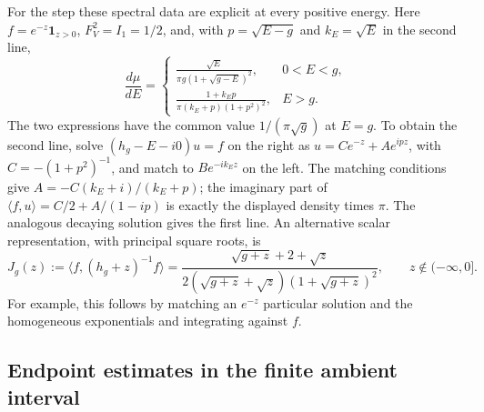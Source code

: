 \documentclass[aps,prl,reprint,superscriptaddress,longbibliography]{revtex4-2}
\begin{document}
For the step these spectral data are explicit at every positive energy.
Here $f=e^{-z}\mathbf1_{z>0}$, $F_V^2=I_1=1/2$, and, with
$p=\sqrt{E-g}$ and $k_E=\sqrt E$ in the second line,
\begin{equation}
 \frac{d\mu}{dE}=
 \begin{cases}
 \displaystyle\frac{\sqrt E}{\pi g(1+\sqrt{g-E})^2},&0<E<g,\\[6pt]
 \displaystyle\frac{1+k_Ep}{\pi(k_E+p)(1+p^2)^2},&E>g.
 \end{cases}
 \label{sc:step-density}
\end{equation}
The two expressions have the common value $1/(\pi\sqrt g)$ at $E=g$.
To obtain the second line, solve $(h_g-E-i0)u=f$ on the right as
$u=Ce^{-z}+Ae^{ipz}$, with
$C=-(1+p^2)^{-1}$, and match to $Be^{-ik_Ez}$ on the left. The matching
conditions give $A=-C(k_E+i)/(k_E+p)$; the imaginary part of
$\langle f,u\rangle=C/2+A/(1-ip)$ is exactly the displayed density
times $\pi$. The analogous decaying solution gives the first line.
An alternative scalar representation, with principal square roots, is
\begin{equation}
 J_g(z):=\langle f,(h_g+z)^{-1}f\rangle
 =\frac{\sqrt{g+z}+2+\sqrt z}
 {2(\sqrt{g+z}+\sqrt z)(1+\sqrt{g+z})^2},
 \qquad z\notin(-\infty,0].
 \label{sc:step-resolvent}
\end{equation}
For example, this follows by matching an $e^{-z}$ particular solution
and the homogeneous exponentials and integrating against $f$.

\subsection{Endpoint estimates in the finite ambient interval}
\label{sc:endpoints}
\end{document}
